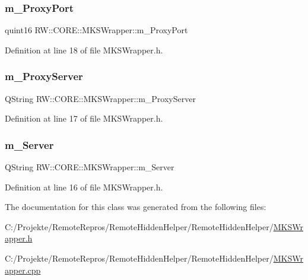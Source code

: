 \subsubsection{\texorpdfstring{m\+\_\+\+Proxy\+Port}{m\_ProxyPort}}
{\footnotesize\ttfamily quint16 R\+W\+::\+C\+O\+R\+E\+::\+M\+K\+S\+Wrapper\+::m\+\_\+\+Proxy\+Port\hspace{0.3cm}{\ttfamily [private]}}



Definition at line 18 of file M\+K\+S\+Wrapper.\+h.

\hypertarget{class_r_w_1_1_c_o_r_e_1_1_m_k_s_wrapper_a61772018c0b8e4a38b4576dd93c00949}{}\label{class_r_w_1_1_c_o_r_e_1_1_m_k_s_wrapper_a61772018c0b8e4a38b4576dd93c00949} 
\subsubsection{\texorpdfstring{m\+\_\+\+Proxy\+Server}{m\_ProxyServer}}
{\footnotesize\ttfamily Q\+String R\+W\+::\+C\+O\+R\+E\+::\+M\+K\+S\+Wrapper\+::m\+\_\+\+Proxy\+Server\hspace{0.3cm}{\ttfamily [private]}}



Definition at line 17 of file M\+K\+S\+Wrapper.\+h.

\hypertarget{class_r_w_1_1_c_o_r_e_1_1_m_k_s_wrapper_ae692d4f39fa2ff103a409afd2400bd50}{}\label{class_r_w_1_1_c_o_r_e_1_1_m_k_s_wrapper_ae692d4f39fa2ff103a409afd2400bd50} 
\subsubsection{\texorpdfstring{m\+\_\+\+Server}{m\_Server}}
{\footnotesize\ttfamily Q\+String R\+W\+::\+C\+O\+R\+E\+::\+M\+K\+S\+Wrapper\+::m\+\_\+\+Server\hspace{0.3cm}{\ttfamily [private]}}



Definition at line 16 of file M\+K\+S\+Wrapper.\+h.



The documentation for this class was generated from the following files\+:\begin{DoxyCompactItemize}
\item 
C\+:/\+Projekte/\+Remote\+Repros/\+Remote\+Hidden\+Helper/\+Remote\+Hidden\+Helper/\hyperlink{_m_k_s_wrapper_8h}{M\+K\+S\+Wrapper.\+h}\item 
C\+:/\+Projekte/\+Remote\+Repros/\+Remote\+Hidden\+Helper/\+Remote\+Hidden\+Helper/\hyperlink{_m_k_s_wrapper_8cpp}{M\+K\+S\+Wrapper.\+cpp}\end{DoxyCompactItemize}
